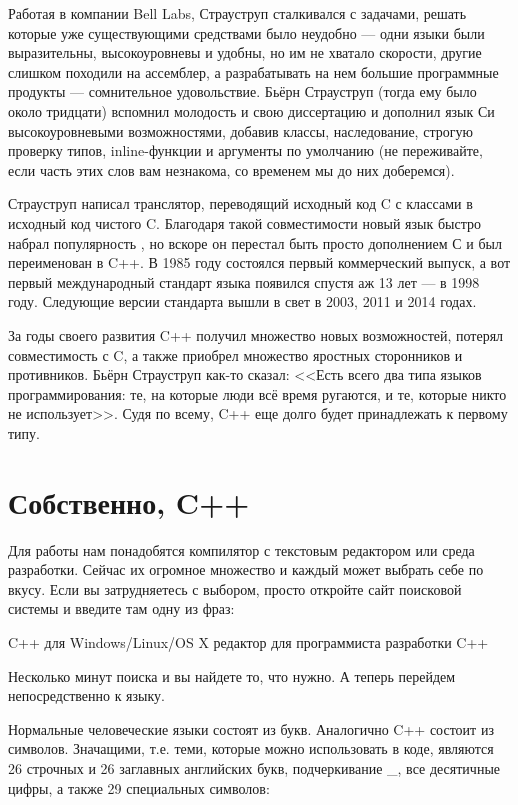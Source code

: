 \documentclass{article}
\begin{document}
Работая в компании Bell Labs, Страуструп сталкивался с задачами, решать которые уже существующими средствами было неудобно --- одни языки были выразительны, высокоуровневы и удобны, но им не хватало скорости, другие слишком походили на ассемблер, а разрабатывать на нем большие программные продукты --- сомнительное удовольствие. Бьёрн Страуструп (тогда ему было около тридцати) вспомнил молодость и свою диссертацию и дополнил язык Си высокоуровневыми возможностями, добавив классы, наследование, строгую проверку типов, inline-функции и аргументы по умолчанию (не переживайте, если часть этих слов вам незнакома, со временем мы до них доберемся).

Страуструп написал транслятор, переводящий исходный код C с классами в исходный код чистого C. Благодаря такой совместимости новый язык быстро набрал популярность , но вскоре он перестал быть просто дополнением С и был переименован в C++. В 1985 году состоялся первый коммерческий выпуск, а вот первый международный стандарт языка появился спустя аж 13 лет --- в 1998 году. Следующие версии стандарта вышли в свет в 2003, 2011 и 2014 годах.

За годы своего развития C++ получил множество новых возможностей, потерял совместимость с C, а также приобрел множество яростных сторонников и противников. Бьёрн Страуструп как-то сказал: <<Есть всего два типа языков программирования: те, на которые люди всё время ругаются, и те, которые никто не использует>>. Судя по всему, C++ еще долго будет принадлежать к первому типу.

\section*{Собственно, C++}

Для работы нам понадобятся компилятор с текстовым редактором или среда разработки. Сейчас их огромное множество и каждый может выбрать себе по вкусу. Если вы затрудняетесь с выбором, просто откройте сайт поисковой системы и введите там одну из фраз:

\begin{itemize}
 C++ для Windows/Linux/OS X
 редактор для программиста
 разработки C++
\end{itemize}

Несколько минут поиска и вы найдете то, что нужно. А теперь перейдем непосредственно к языку.

Нормальные человеческие языки состоят из букв. Аналогично C++ состоит из символов. Значащими, т.е. теми, которые можно использовать в коде, являются 26 строчных и 26 заглавных английских букв, подчеркивание \_, все десятичные цифры, а также 29 специальных символов: 
\end{document}
